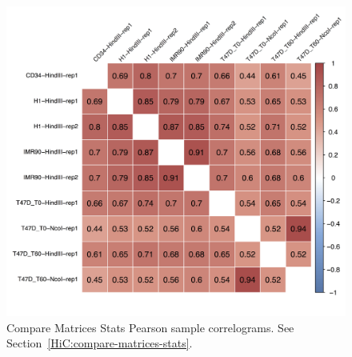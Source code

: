 \begin{figure}[!htb]
    \centering
    \includegraphics[width=\textwidth,height=\textheight,keepaspectratio]{figure/compare-matrices-stats_pearson_correlograms}
    \caption{Compare Matrices Stats Pearson sample correlograms. See Section~\ref{HiC:compare-matrices-stats}.} %
    \label{fig:compare-matrices-stats_Pearson-correlograms}
\end{figure}
\clearpage